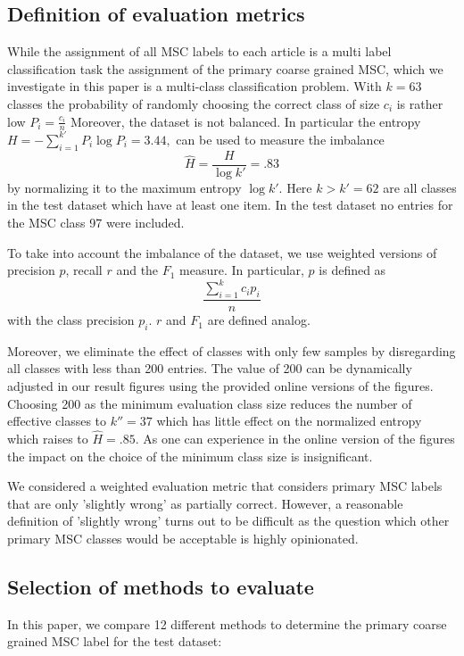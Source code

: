 \subsection{Definition of evaluation metrics}
While the assignment of all MSC labels to each article is a multi label classification task the assignment of the primary coarse grained MSC, which we investigate in this paper is a multi-class classification problem.
With $k=63$ classes the probability of randomly choosing the correct class of size $c_i$ is rather low
\(
P_i=\frac{c_i}{n}
\)
Moreover, the dataset is not balanced. In particular the entropy \(
H=-\sum_{i=1}^{k'}P_i\log P_i=3.44,
\)
can be used to measure the imbalance \[
\hat{H}=\frac{H}{\log k'}=.83
\]
by normalizing it to the maximum entropy $\log k'.$
Here $k>k'=62$ are all classes in the test dataset which have at least one item. 
In the test dataset no entries for the MSC class 97 were included.

To take into account the imbalance of the dataset, we use weighted versions of precision $p$, recall $r$ and the $F_1$ measure. In particular, $p$ is defined as \[
\frac{\sum_{i=1}^{k}c_ip_i}{n}
\] with the class precision $p_i$.
$r$ and $F_1$ are defined analog.

Moreover, we eliminate the effect of classes with only few samples by disregarding all classes with less than 200 entries.
The value of 200 can be dynamically adjusted in our result figures using the provided online versions of the figures.
Choosing 200 as the minimum evaluation class size reduces the number of effective classes to $k''=37$ which has little effect on the normalized entropy which raises to $\hat{H}=.85.$
As one can experience in the online version of the figures the impact on the choice of the minimum class size is insignificant.

We considered a weighted evaluation metric that considers primary MSC labels that are only 'slightly wrong' as partially correct.
However, a reasonable definition of 'slightly wrong' turns out to be difficult as the question which other primary MSC classes would be acceptable is highly opinionated.
\subsection{Selection of methods to evaluate}


In this paper, we compare 12 different methods to determine the primary coarse grained MSC label for the test dataset:

